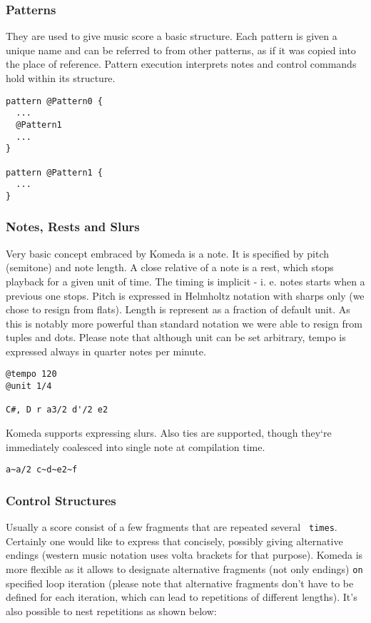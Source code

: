 \documentclass{article}
\begin{document}
\subsubsection{Patterns}
They are used to give music score a basic structure. Each pattern is given a
unique name and can be referred to from other patterns, as if it was copied
into the place of reference. Pattern execution interprets notes and control
commands hold within its structure.

\begin{lstlisting}[caption=Example of pattern invocation]
pattern @Pattern0 {
  ...
  @Pattern1
  ... 
}

pattern @Pattern1 {
  ...
}
\end{lstlisting}

\subsubsection{Notes, Rests and Slurs}
Very basic concept embraced by Komeda is a note. It is specified by pitch
(semitone) and note length. A close relative of a note is a rest, which stops
playback for a given unit of time. The timing is implicit - i. e. notes starts
when a previous one stops. Pitch is expressed in Helmholtz notation with sharps
only (we chose to resign from flats). Length is represent as a fraction of
default unit. As this is notably more powerful than standard notation we were
able to resign from tuples and dots. Please note that although unit can be set
arbitrary, tempo is expressed always in quarter notes per minute.

\begin{lstlisting}[caption=Sample music score]
@tempo 120
@unit 1/4

C#, D r a3/2 d'/2 e2
\end{lstlisting}

Komeda supports expressing slurs. Also ties are supported, though they`re
immediately coalesced into single note at compilation time.

\begin{lstlisting}[caption=Expressing slurs]
a~a/2 c~d~e2~f
\end{lstlisting}

\subsubsection{Control Structures}
Usually a score consist of a few fragments that are repeated several {\tt
  times}. Certainly one would like to express that concisely, possibly giving
alternative endings (western music notation uses volta brackets for that
purpose). Komeda is more flexible as it allows to designate alternative
fragments (not only endings) {\tt on} specified loop iteration (please note
that alternative fragments don't have to be defined for each iteration, which
can lead to repetitions of different lengths). It's also possible to nest
repetitions as shown below:
\end{document}
